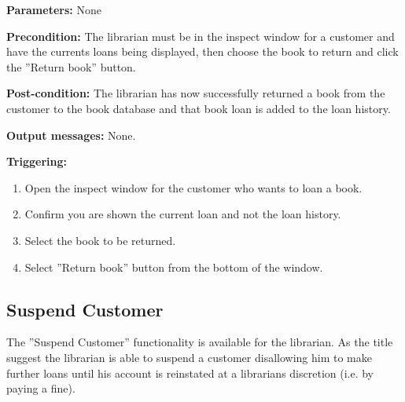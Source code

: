 \begin{description}

\item \textbf{Parameters:} None

\item \textbf{Precondition:} The librarian must be in the inspect window for a
customer and have the currents loans being displayed, then choose the book to
return and click the ''Return book'' button.

\item \textbf{Post-condition:} The librarian has now successfully returned a
book from the customer to the book database and that book loan is added to the
loan history.

\item \textbf{Output messages:} None.

\item \textbf{Triggering:}
\begin{enumerate}
\item Open the inspect window for the customer who wants to loan a book.
\item Confirm you are shown the current loan and not the loan history.
\item Select the book to be returned.
\item Select ''Return book'' button from the bottom of the window.
\end{enumerate}

\end{description}

\subsection{Suspend Customer}

The ''Suspend Customer'' functionality is available for the librarian. As the
title suggest the librarian is able to suspend a customer disallowing him to
make further loans until his account is reinstated at a librarians discretion
(i.e. by paying a fine).


